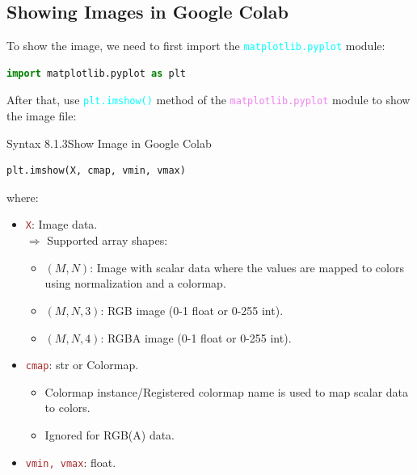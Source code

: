 \documentclass{book}
\begin{document}
\subsection{Showing Images in Google Colab}
To show the image, we need to first import the \textcolor{cyan}{\texttt{matplotlib.pyplot}} module:
\begin{lstlisting}[language=Python, basicstyle=\ttfamily\small, keywordstyle=\color{blue}, commentstyle=\color{forestgreen}, stringstyle=\color{red}, showstringspaces=false]
                                    import matplotlib.pyplot as plt
\end{lstlisting}
After that, use \textcolor{cyan}{\texttt{plt.imshow()}} method of the \textcolor{violet}{\texttt{matplotlib.pyplot}} module to show the image file:
\begin{synBox}{Syntax 8.1.3}{Show Image in Google Colab}
    \raggedright
    \begin{lstlisting}[language=Python, basicstyle=\ttfamily\small, keywordstyle=\color{blue}, commentstyle=\color{forestgreen}, stringstyle=\color{red}, showstringspaces=false]
                                    plt.imshow(X, cmap, vmin, vmax)
    \end{lstlisting}
    where:\\
    \begin{itemize}
        \item \textcolor{brown}{\texttt{X}}: Image data.\\
        $\Rightarrow$ Supported array shapes:
        \begin{itemize}
            \item $(M,N)$: Image with scalar data where the values are mapped to colors using normalization and a colormap.
            \item $(M,N,3)$: RGB image (0-1 float or 0-255 int).
            \item $(M,N,4)$: RGBA image (0-1 float or 0-255 int).
        \end{itemize}
        \item \textcolor{brown}{\texttt{cmap}}: str or Colormap.\\
        \begin{itemize}
            \item Colormap instance/Registered colormap name is used to map scalar data to colors.
            \item Ignored for RGB(A) data.
        \end{itemize}
        \item \textcolor{brown}{\texttt{vmin, vmax}}: float.\\

\end{itemize}
\end{synBox}
\end{document}
